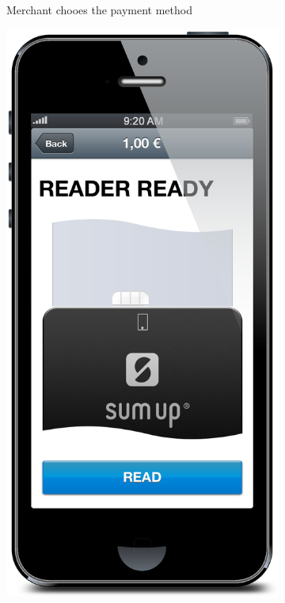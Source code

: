 \documentclass[a4paper, oneside]{csthesis}
\begin{document}
\begin{figure}
\begin{subfigure}[b]{0.22\textwidth}
                \caption{Merchant chooes the payment method}
                \label{fig:flow2}
        \end{subfigure}
        \begin{subfigure}[b]{0.22\textwidth}
                \centering
                \includegraphics[width=\textwidth]{figures/flow3.png}

\end{subfigure}
\end{figure}
\end{document}
